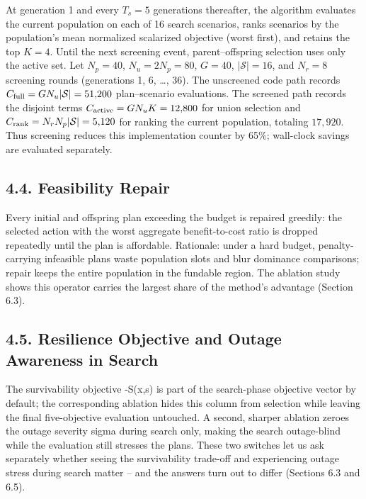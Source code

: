 \documentclass[
  10pt,
  a4paper,
]{article}
\begin{document}
At generation 1 and every \(T_s = 5\) generations thereafter, the
algorithm evaluates the current population on each of 16 search
scenarios, ranks scenarios by the population's mean normalized
scalarized objective (worst first), and retains the top \(K = 4\). Until
the next screening event, parent--offspring selection uses only the
active set. Let \(N_p=40\), \(N_u=2N_p=80\), \(G=40\),
\(|\mathcal S|=16\), and \(N_r=8\) screening rounds (generations 1, 6,
\ldots, 36). The unscreened code path records
\(C_{\rm full}=G N_u|\mathcal S|=51{,}200\) plan--scenario evaluations.
The screened path records the disjoint terms
\(C_{\rm active}=G N_uK=12{,}800\) for union selection and
\(C_{\rm rank}=N_rN_p|\mathcal S|=5{,}120\) for ranking the current
population, totaling \(17{,}920\). Thus screening reduces this
implementation counter by 65\%; wall-clock savings are evaluated
separately.

\subsection{4.4. Feasibility Repair}\label{feasibility-repair}

Every initial and offspring plan exceeding the budget is repaired
greedily: the selected action with the worst aggregate benefit-to-cost
ratio is dropped repeatedly until the plan is affordable. Rationale:
under a hard budget, penalty-carrying infeasible plans waste population
slots and blur dominance comparisons; repair keeps the entire population
in the fundable region. The ablation study shows this operator carries
the largest share of the method's advantage (Section 6.3).

\subsection{4.5. Resilience Objective and Outage Awareness in
Search}\label{resilience-objective-and-outage-awareness-in-search}

The survivability objective -S(x,s) is part of the search-phase
objective vector by default; the corresponding ablation hides this
column from selection while leaving the final five-objective evaluation
untouched. A second, sharper ablation zeroes the outage severity sigma
during search only, making the search outage-blind while the evaluation
still stresses the plans. These two switches let us ask separately
whether seeing the survivability trade-off and experiencing outage
stress during search matter -- and the answers turn out to differ
(Sections 6.3 and 6.5).
\end{document}
